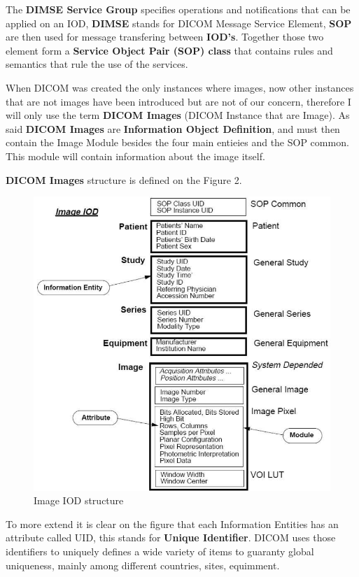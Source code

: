 \newline \vspace{5mm}
The \textbf{DIMSE Service Group} specifies operations and notifications that can be applied on an IOD, \textbf{DIMSE} stands for DICOM Message Service Element, \textbf{SOP} are then used for message transfering between \textbf{IOD's}. Together those two element form a \textbf{Service Object Pair (SOP) class} that contains rules and semantics that rule the use of the services.

\newline \vspace{5mm}
When DICOM was created the only instances where images, now other instances that are not images have been introduced but are not of our concern, therefore I will only use the term \textbf{DICOM Images} (DICOM Instance that are Image). As said \textbf{DICOM Images} are \textbf{Information Object Definition}, and must then contain the Image Module besides the four main entieies and the SOP common. This module will contain information about the image itself.

\textbf{DICOM Images} structure is defined on the Figure 2.


\begin{figure}[ht]
\centering
\includegraphics[width = 0.85\hsize]{./figures/ImageIOD}
\caption{Image IOD structure}
\end{figure}

To more extend it is clear on the figure that each Information Entities has an attribute called UID, this stands for \textbf{Unique Identifier}. DICOM uses those identifiers to uniquely defines a wide variety of items to guaranty global uniqueness, mainly among different countries, sites, equimment.


